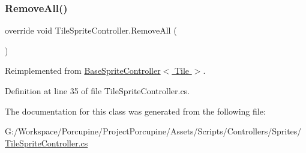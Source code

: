 \subsubsection{\texorpdfstring{Remove\+All()}{RemoveAll()}}
{\footnotesize\ttfamily override void Tile\+Sprite\+Controller.\+Remove\+All (\begin{DoxyParamCaption}{ }\end{DoxyParamCaption})\hspace{0.3cm}{\ttfamily [virtual]}}



Reimplemented from \hyperlink{class_base_sprite_controller_ae1fdf8c0abb1e362257540f2de80d6dc}{Base\+Sprite\+Controller$<$ Tile $>$}.



Definition at line 35 of file Tile\+Sprite\+Controller.\+cs.



The documentation for this class was generated from the following file\+:\begin{DoxyCompactItemize}
\item 
G\+:/\+Workspace/\+Porcupine/\+Project\+Porcupine/\+Assets/\+Scripts/\+Controllers/\+Sprites/\hyperlink{_tile_sprite_controller_8cs}{Tile\+Sprite\+Controller.\+cs}\end{DoxyCompactItemize}
